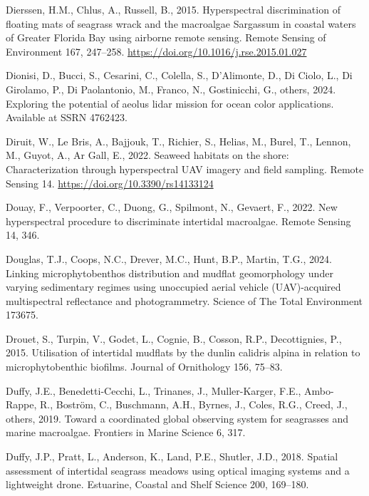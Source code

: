 \documentclass[
  letterpaper,
  11pt,
  english,
  singlespacing,
  headsepline]{MastersDoctoralThesis}
\newlength{\cslhangindent}
\newenvironment{CSLReferences}[2] %
 {\begin{list}{}{%
  \setlength{\itemindent}{0pt}
  \setlength{\leftmargin}{0pt}
  \setlength{\parsep}{0pt}
  \ifodd #1
   \setlength{\leftmargin}{\cslhangindent}
   \setlength{\itemindent}{-1\cslhangindent}
  \fi
  \setlength{\itemsep}{#2\baselineskip}}}
 {\end{list}}
\begin{document}
\begin{CSLReferences}{1}{0}
Dierssen, H.M., Chlus, A., Russell, B., 2015. {Hyperspectral
discrimination of floating mats of seagrass wrack and the macroalgae
Sargassum in coastal waters of Greater Florida Bay using airborne remote
sensing}. Remote Sensing of Environment 167, 247--258.
\url{https://doi.org/10.1016/j.rse.2015.01.027}

Dionisi, D., Bucci, S., Cesarini, C., Colella, S., D'Alimonte, D., Di
Ciolo, L., Di Girolamo, P., Di Paolantonio, M., Franco, N., Gostinicchi,
G., others, 2024. Exploring the potential of aeolus lidar mission for
ocean color applications. Available at SSRN 4762423.

Diruit, W., Le Bris, A., Bajjouk, T., Richier, S., Helias, M., Burel,
T., Lennon, M., Guyot, A., Ar Gall, E., 2022. Seaweed habitats on the
shore: Characterization through hyperspectral UAV imagery and field
sampling. Remote Sensing 14. \url{https://doi.org/10.3390/rs14133124}

Douay, F., Verpoorter, C., Duong, G., Spilmont, N., Gevaert, F., 2022.
New hyperspectral procedure to discriminate intertidal macroalgae.
Remote Sensing 14, 346.

Douglas, T.J., Coops, N.C., Drever, M.C., Hunt, B.P., Martin, T.G.,
2024. Linking microphytobenthos distribution and mudflat geomorphology
under varying sedimentary regimes using unoccupied aerial vehicle
(UAV)-acquired multispectral reflectance and photogrammetry. Science of
The Total Environment 173675.

Drouet, S., Turpin, V., Godet, L., Cognie, B., Cosson, R.P.,
Decottignies, P., 2015. Utilisation of intertidal mudflats by the dunlin
calidris alpina in relation to microphytobenthic biofilms. Journal of
Ornithology 156, 75--83.

Duffy, J.E., Benedetti-Cecchi, L., Trinanes, J., Muller-Karger, F.E.,
Ambo-Rappe, R., Boström, C., Buschmann, A.H., Byrnes, J., Coles, R.G.,
Creed, J., others, 2019. Toward a coordinated global observing system
for seagrasses and marine macroalgae. Frontiers in Marine Science 6,
317.

Duffy, J.P., Pratt, L., Anderson, K., Land, P.E., Shutler, J.D., 2018.
Spatial assessment of intertidal seagrass meadows using optical imaging
systems and a lightweight drone. Estuarine, Coastal and Shelf Science
200, 169--180.


\end{CSLReferences}
\end{document}
